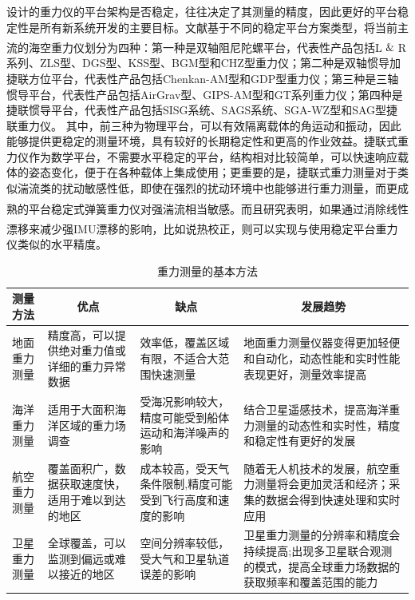 \documentclass[12pt,a4,utf8]{article}
\newcommand{\upcite}[1]{\textsuperscript{\textsuperscript{\cite{#1}}}} %
\begin{document}
设计的重力仪的平台架构是否稳定，往往决定了其测量的精度，因此更好的平台稳定性是所有新系统开发的主要目标。文献\cite{huang2017development}基于不同的稳定平台方案类型，将当前主流的海空重力仪划分为四种\upcite{huang2017development,lacoste1967lacoste,Zongjie,Reviewon,Newlydeveloped,valliant2019lacoste}：第一种是双轴阻尼陀螺平台，代表性产品包括L$\And$R系列、ZLS型、DGS型、KSS型、BGM型和CHZ型重力仪；第二种是双轴惯导加捷联方位平台，代表性产品包括Chenkan-AM型和GDP型重力仪；第三种是三轴惯导平台，代表性产品包括AirGrav型、GIPS-AM型和GT系列重力仪；第四种是捷联惯导平台，代表性产品包括SISG系统、SAGS系统、SGA-WZ型和SAG型捷联重力仪。
其中，前三种为物理平台，可以有效隔离载体的角运动和振动，因此能够提供更稳定的测量环境，具有较好的长期稳定性和更高的作业效益。捷联式重力仪作为数学平台，不需要水平稳定的平台，结构相对比较简单，可以快速响应载体的姿态变化，便于在各种载体上集成使用；更重要的是，捷联式重力测量对于类似湍流类的扰动敏感性低，即使在强烈的扰动环境中也能够进行重力测量，而更成熟的平台稳定式弹簧重力仪对强湍流相当敏感\upcite{becker2016advanced}。而且研究表明\upcite{johann2019direct,wei1998flight,bastos2002gravity}，如果通过消除线性漂移来减少强IMU漂移的影响，比如说热校正\upcite{becker2015drift}，则可以实现与使用稳定平台重力仪类似的水平精度。
\begin{table}[htbp]
      \centering
      \caption{重力测量的基本方法}
        \begin{tabular}{m{6.3em}<{\centering} m{7em}<{\centering} m{7.6em}<{\centering} m{10.125em}<{\centering}}
        \toprule
        \textbf{测量方法} & \multicolumn{1}{c}{\textbf{优点}} & \multicolumn{1}{c}{\textbf{缺点}} & \multicolumn{1}{c}{\textbf{发展趋势}} \\
        \midrule
        地面重力测量 & 精度高，可以提供绝对重力值或详细的重力异常数据 & 效率低，覆盖区域有限，不适合大范围快速测量 & 地面重力测量仪器变得更加轻便和自动化，动态性能和实时性能表现更好，测量效率提高 \\
        \midrule
        海洋重力测量 & 适用于大面积海洋区域的重力场调查 & 受海况影响较大，精度可能受到船体运动和海洋噪声的影响 & 结合卫星遥感技术，提高海洋重力测量的动态性和实时性，精度和稳定性有更好的发展 \\
        \midrule
        航空重力测量 & 覆盖面积广，数据获取速度快，适用于难以到达的地区 & 成本较高，受天气条件限制,精度可能受到飞行高度和速度的影响 & 随着无人机技术的发展，航空重力测量将会更加灵活和经济；\newline{}采集的数据会得到快速处理和实时应用 \\
        \midrule
        卫星重力测量 & 全球覆盖，可以监测到偏远或难以接近的地区 & 空间分辨率较低，受大气和卫星轨道误差的影响 & 卫星重力测量的分辨率和精度会持续提高;\newline{}出现多卫星联合观测的模式，提高全球重力场数据的获取频率和覆盖范围的能力 \\
        \bottomrule
        \end{tabular}%
      \label{tab_1}%
\end{table}%
\end{document}
